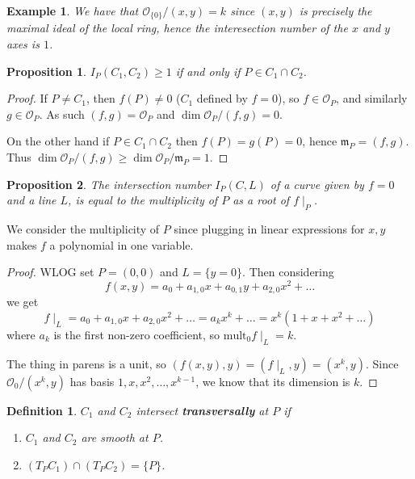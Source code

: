 \documentclass[12pt]{article}
\newcommand{\m}{\mathfrak{m}}
\renewcommand{\O}{\mathcal{O}}
\newcommand{\mult}{\mathrm{mult}}
\newtheorem{definition}{Definition}[section]
\newtheorem*{example}{Example}
\newtheorem{proposition}{Proposition}[section]
\begin{document}
    \begin{example}
        We have that $\O_{\{0\}}/(x, y) = k$ since $(x, y)$ is precisely the maximal ideal of the local ring, hence the interesection number of the $x$ and $y$ axes is $1$.
    \end{example}
    \begin{proposition}
        $I_P(C_1, C_2) \geq 1$ if and only if $P \in C_1 \cap C_2$. 
    \end{proposition}
    \begin{proof}
        If $P\neq C_1$, then $f(P) \neq 0$ ($C_1$ defined by $f= 0$), so $f \in \O_P$, and similarly $g \in \O_P$. As such $(f, g) = \O_P$ and $\dim \O_P/(f, g) = 0$. \par 
        On the other hand if $P \in C_1 \cap C_2$ then $f(P) = g(P) = 0$, hence $\m_P = (f, g)$. Thus $\dim \O_P/(f, g) \geq \dim \O_P/\m_P = 1$. 
    \end{proof}
    \begin{proposition}
        The intersection number $I_P(C, L)$ of a curve given by $f = 0$ and a line $L$, is equal to the multiplicity of $P$ as a root of $f\mid_P$. 
    \end{proposition}
    We consider the multiplicity of $P$ since plugging in linear expressions for $x, y$ makes $f$ a polynomial in one variable. \par 
    \begin{proof}
        WLOG set $P = (0, 0)$ and $L = \{y = 0\}$. Then considering 
        $$f(x, y) = a_0 + a_{1, 0}x + a_{0,1}y + a_{2, 0}x^2 + \dots $$
        we get 
        $$f\mid_L = a_0 + a_{1, 0}x + a_{2, 0}x^2 + \dots = a_kx^k + \dots = x^k(1 + x + x^2 + \dots)$$
        where $a_k$ is the first non-zero coefficient, so $\mult_0 f\mid_L = k$. \par 
        The thing in parens is a unit, so $(f(x, y), y) = (f\mid_L, y) = (x^k, y)$. Since $\O_0/(x^k, y)$ has basis $1, x, x^2, \dots, x^{k-1}$, we know that its dimension is $k$. 
    \end{proof}
    \begin{definition}
        $C_1$ and $C_2$ intersect \textbf{transversally} at $P$ if 
        \begin{enumerate}
            \item $C_1$ and $C_2$ are smooth at $P$. 
            \item $(T_PC_1) \cap (T_PC_2) = \{P\}$. 
        \end{enumerate}
    \end{definition}
\end{document}
